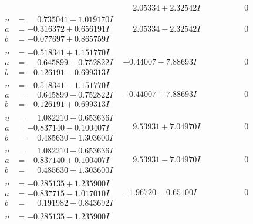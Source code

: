 \documentclass[1p]{elsarticle_modified}
\theoremstyle{definition}
\begin{document}
$$\begin{array}{c|c|c}
 & \phantom{-}2.05334 + 2.32542 I & \phantom{-0.000000 } 0 \\ \hline\begin{aligned}
u &= \phantom{-}0.735041 - 1.019170 I \\
a &= -0.316372 + 0.656191 I \\
b &= -0.077697 + 0.865759 I\end{aligned}
 & \phantom{-}2.05334 - 2.32542 I & \phantom{-0.000000 } 0 \\ \hline\begin{aligned}
u &= -0.518341 + 1.151770 I \\
a &= \phantom{-}0.645899 + 0.752822 I \\
b &= -0.126191 - 0.699313 I\end{aligned}
 & -0.44007 - 7.88693 I & \phantom{-0.000000 } 0 \\ \hline\begin{aligned}
u &= -0.518341 - 1.151770 I \\
a &= \phantom{-}0.645899 - 0.752822 I \\
b &= -0.126191 + 0.699313 I\end{aligned}
 & -0.44007 + 7.88693 I & \phantom{-0.000000 } 0 \\ \hline\begin{aligned}
u &= \phantom{-}1.082210 + 0.653636 I \\
a &= -0.837140 - 0.100407 I \\
b &= \phantom{-}0.485630 - 1.303600 I\end{aligned}
 & \phantom{-}9.53931 + 7.04970 I & \phantom{-0.000000 } 0 \\ \hline\begin{aligned}
u &= \phantom{-}1.082210 - 0.653636 I \\
a &= -0.837140 + 0.100407 I \\
b &= \phantom{-}0.485630 + 1.303600 I\end{aligned}
 & \phantom{-}9.53931 - 7.04970 I & \phantom{-0.000000 } 0 \\ \hline\begin{aligned}
u &= -0.285135 + 1.235900 I \\
a &= -0.837715 - 1.017010 I \\
b &= \phantom{-}0.191982 + 0.843692 I\end{aligned}
 & -1.96720 - 0.65100 I & \phantom{-0.000000 } 0 \\ \hline\begin{aligned}
u &= -0.285135 - 1.235900 I \\

\end{aligned}
\end{array}$$
\end{document}
